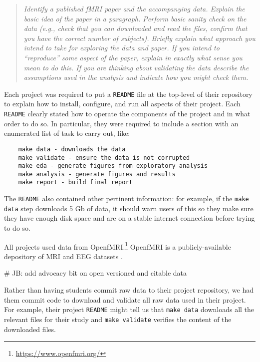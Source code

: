 \begin{quote}\emph{
Identify a published fMRI paper and the accompanying data.
Explain the basic idea of the paper in a paragraph.
Perform basic sanity check on the data
(e.g., check that you can downloaded and read the files,
confirm that you have the correct number of subjects).
Briefly explain what approach you intend to take for exploring
the data and paper.  If you intend to ``reproduce'' some aspect of the paper,
explain in exactly what sense you mean to do this.  If you are thinking about
validating the data describe the assumptions used in the analysis and indicate
how you might check them.
}\end{quote}

Each project was required to put a \texttt{README} file at the top-level
of their repository to explain how to install, configure,
and run all aspects of their project.
Each \texttt{README} clearly stated  how to operate the
components of the project and in what order to do so.
In particular, they were required to include a section with
an enumerated list of task to carry out, like:
\begin{verbatim}
    make data - downloads the data 
    make validate - ensure the data is not corrupted
    make eda - generate figures from exploratory analysis
    make analysis - generate figures and results
    make report - build final report
\end{verbatim}

The \texttt{README} also contained other pertinent information:
for example, if the \texttt{make data} step downloads 5 Gb of data, it should
warn users of this so they make sure they have enough disk space and are on a
stable internet connection before trying to do so.
 
All projects used data from OpenfMRI.\footnote{\url{https://www.openfmri.org/}}
OpenfMRI is a publicly-available depository of MRI and EEG datasets
\citep{poldrack2013toward,poldrack2015openfmri}.

# JB: add advocacy bit on open versioned and citable data

Rather than having students commit raw data to their project repository, we had
them commit code to download and validate all raw data used in their project.
For example, their project \texttt{README} might tell us that \texttt{make data}
downloads all the relevant files for their study and \texttt{make validate}
verifies the content of the downloaded files.

